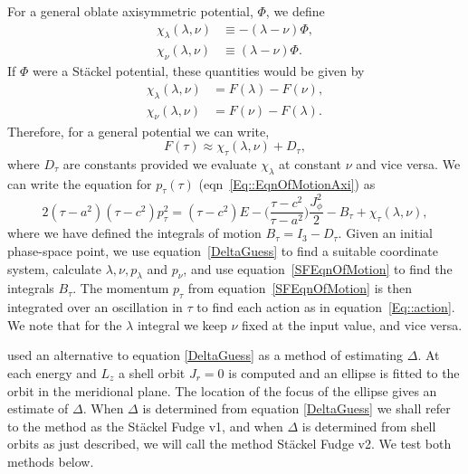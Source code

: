 \documentclass[useAMS,usenatbib,fleqn,a4paper]{mn2e}
\begin{document}
For a general oblate axisymmetric potential,
$\Phi$, we define
\begin{equation}
\begin{split}
\chi_\lambda(\lambda,\nu) &\equiv -(\lambda-\nu)\Phi,\\
\chi_\nu(\lambda,\nu) &\equiv (\lambda-\nu)\Phi.
\end{split}
\end{equation}
If $\Phi$ were a St\"ackel potential, these quantities would be given by
\begin{equation}
\begin{split}
\chi_\lambda(\lambda,\nu) &= F(\lambda)-F(\nu),\\
\chi_\nu(\lambda,\nu) &= F(\nu)-F(\lambda).
\end{split}
\end{equation}
Therefore, for a general potential we can write,
\begin{equation}
F(\tau) \approx \chi_\tau(\lambda,\nu)+D_\tau,
\end{equation}
where $D_\tau$ are constants provided we evaluate $\chi_\lambda$ at constant
$\nu$ and vice versa. We can write the equation for $p_\tau(\tau)$
(eqn~\ref{Eq::EqnOfMotionAxi}) as
\begin{equation}
2(\tau-a^2)(\tau-c^2)p_\tau^2 = (\tau-c^2)E-\Big(\frac{\tau-c^2}{\tau-a^2}\Big)\frac{J_\phi^2}{2}-B_\tau+\chi_\tau(\lambda,\nu),
\label{SFEqnOfMotion}
\end{equation}
where we have defined the integrals of motion $B_\tau = I_3-D_\tau$. Given an
initial phase-space point, we use equation~\eqref{DeltaGuess} to find a
suitable coordinate system, calculate $\lambda,\nu,p_\lambda$ and $p_\nu$,
and use equation~\eqref{SFEqnOfMotion} to find the integrals $B_\tau$. The
momentum $p_\tau$ from equation~\eqref{SFEqnOfMotion} is then integrated over
an oscillation in $\tau$ to find each action as in
equation~\eqref{Eq::action}. We note that for the $\lambda$ integral we keep
$\nu$ fixed at the input value, and vice versa.

\cite{Binney2014_ISO} used an alternative to equation \eqref{DeltaGuess} as a
method of estimating $\Delta$. At each energy and $L_z$ a shell orbit $J_r=0$
is computed and an ellipse is fitted to the orbit in the meridional plane.
The location of the focus of the ellipse gives an estimate of $\Delta$. When
$\Delta$ is determined from equation \eqref{DeltaGuess} we shall refer to the
method as the St\"ackel Fudge v1, and when $\Delta$ is determined from shell
orbits as just described, we will call the method St\"ackel Fudge v2.
We test both methods below.
\end{document}

